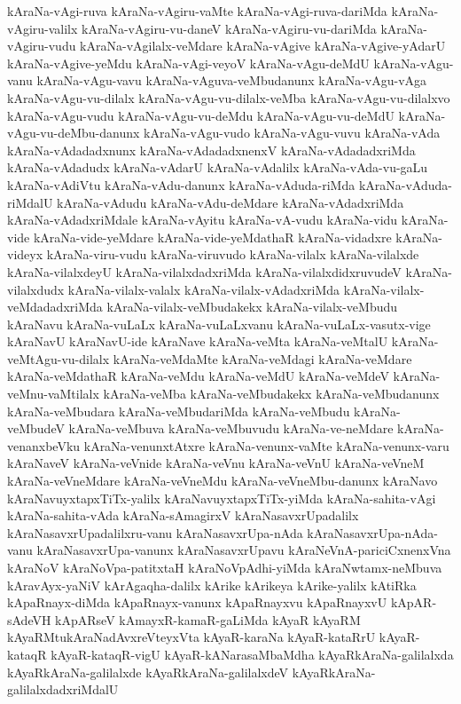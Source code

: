 {kAraNa-vAgi-ruva
kAraNa-vAgiru-vaMte
kAraNa-vAgi-ruva-dariMda
kAraNa-vAgiru-valilx
kAraNa-vAgiru-vu-daneV
kAraNa-vAgiru-vu-dariMda
kAraNa-vAgiru-vudu
kAraNa-vAgilalx-veMdare
kAraNa-vAgive
kAraNa-vAgive-yAdarU
kAraNa-vAgive-yeMdu
kAraNa-vAgi-veyoV
kAraNa-vAgu-deMdU
kAraNa-vAgu-vanu
kAraNa-vAgu-vavu
kAraNa-vAguva-veMbudanunx
kAraNa-vAgu-vAga
kAraNa-vAgu-vu-dilalx
kAraNa-vAgu-vu-dilalx-veMba
kAraNa-vAgu-vu-dilalxvo
kAraNa-vAgu-vudu
kAraNa-vAgu-vu-deMdu
kAraNa-vAgu-vu-deMdU
kAraNa-vAgu-vu-deMbu-danunx
kAraNa-vAgu-vudo
kAraNa-vAgu-vuvu
kAraNa-vAda
kAraNa-vAdadadxnunx
kAraNa-vAdadadxnenxV
kAraNa-vAdadadxriMda
kAraNa-vAdadudx
kAraNa-vAdarU
kAraNa-vAdalilx
kAraNa-vAda-vu-gaLu
kAraNa-vAdiVtu
kAraNa-vAdu-danunx
kAraNa-vAduda-riMda
kAraNa-vAduda-riMdalU
kAraNa-vAdudu
kAraNa-vAdu-deMdare
kAraNa-vAdadxriMda
kAraNa-vAdadxriMdale
kAraNa-vAyitu
kAraNa-vA-vudu
kAraNa-vidu
kAraNa-vide
kAraNa-vide-yeMdare
kAraNa-vide-yeMdathaR
kAraNa-vidadxre
kAraNa-videyx
kAraNa-viru-vudu
kAraNa-viruvudo
kAraNa-vilalx
kAraNa-vilalxde
kAraNa-vilalxdeyU
kAraNa-vilalxdadxriMda
kAraNa-vilalxdidxruvudeV
kAraNa-vilalxdudx
kAraNa-vilalx-valalx
kAraNa-vilalx-vAdadxriMda
kAraNa-vilalx-veMdadadxriMda
kAraNa-vilalx-veMbudakekx
kAraNa-vilalx-veMbudu
kAraNavu
kAraNa-vuLaLx
kAraNa-vuLaLxvanu
kAraNa-vuLaLx-vasutx-vige
kAraNavU
kAraNavU-ide
kAraNave
kAraNa-veMta
kAraNa-veMtalU
kAraNa-veMtAgu-vu-dilalx
kAraNa-veMdaMte
kAraNa-veMdagi
kAraNa-veMdare
kAraNa-veMdathaR
kAraNa-veMdu
kAraNa-veMdU
kAraNa-veMdeV
kAraNa-veMnu-vaMtilalx
kAraNa-veMba
kAraNa-veMbudakekx
kAraNa-veMbudanunx
kAraNa-veMbudara
kAraNa-veMbudariMda
kAraNa-veMbudu
kAraNa-veMbudeV
kAraNa-veMbuva
kAraNa-veMbuvudu
kAraNa-ve-neMdare
kAraNa-venanxbeVku
kAraNa-venunxtAtxre
kAraNa-venunx-vaMte
kAraNa-venunx-varu
kAraNaveV
kAraNa-veVnide
kAraNa-veVnu
kAraNa-veVnU
kAraNa-veVneM
kAraNa-veVneMdare
kAraNa-veVneMdu
kAraNa-veVneMbu-danunx
kAraNavo
kAraNavuyxtapxTiTx-yalilx
kAraNavuyxtapxTiTx-yiMda
kAraNa-sahita-vAgi
kAraNa-sahita-vAda
kAraNa-sAmagirxV
kAraNasavxrUpadalilx
kAraNasavxrUpadalilxru-vanu
kAraNasavxrUpa-nAda
kAraNasavxrUpa-nAda-vanu
kAraNasavxrUpa-vanunx
kAraNasavxrUpavu
kAraNeVnA-pariciCxnenxVna
kAraNoV
kAraNoVpa-patitxtaH
kAraNoVpAdhi-yiMda
kAraNwtamx-neMbuva
kAravAyx-yaNiV
kArAgaqha-dalilx
kArike
kArikeya
kArike-yalilx
kAtiRka
kApaRnayx-diMda
kApaRnayx-vanunx
kApaRnayxvu
kApaRnayxvU
kApAR-sAdeVH
kApARseV
kAmayxR-kamaR-gaLiMda
kAyaR
kAyaRM
kAyaRMtukAraNadAvxreVteyxVta
kAyaR-karaNa
kAyaR-kataRrU
kAyaR-kataqR
kAyaR-kataqR-vigU
kAyaR-kANarasaMbaMdha
kAyaRkAraNa-galilalxda
kAyaRkAraNa-galilalxde
kAyaRkAraNa-galilalxdeV
kAyaRkAraNa-galilalxdadxriMdalU
}
